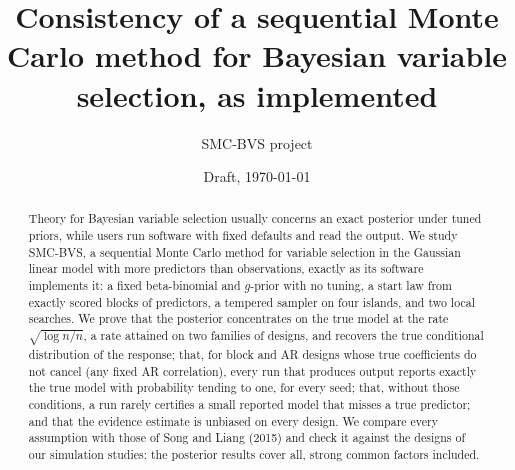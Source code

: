 \documentclass[11pt]{article}
\title{Consistency of a sequential Monte Carlo method for Bayesian variable selection, as implemented}
\author{SMC-BVS project}
\date{Draft, \today}
\begin{document}
\maketitle

\begin{abstract}
\noindent
Theory for Bayesian variable selection usually concerns an exact posterior under tuned priors, while users run
software with fixed defaults and read the output. We study SMC-BVS, a sequential Monte Carlo method for
variable selection in the Gaussian linear model with more predictors than observations, exactly as its software
implements it: a fixed beta-binomial and $g$-prior with no tuning, a start law from exactly scored blocks of
predictors, a tempered sampler on four islands, and two local searches. We prove that the posterior concentrates on the
true model at the rate $\sqrt{\log n/n}$, a rate attained on two families of designs, and recovers the true conditional distribution of
the response; that, for block and AR designs whose true coefficients do not cancel (any fixed AR correlation), every run that produces output reports exactly the true model with
probability tending to one, for every seed; that, without those conditions, a run rarely certifies a small reported model that
misses a true predictor; and that the evidence estimate is unbiased on every design. We compare every assumption with those of Song and
Liang (2015) and check it against the designs of our simulation studies: the posterior results cover all,
strong common factors included.
\end{abstract}










\appendix
\setcounter{theorem}{0}


\end{document}
